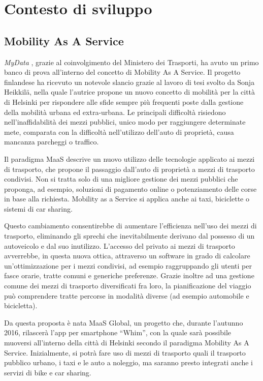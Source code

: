 \chapter{Contesto di sviluppo}
\label{capitolo2}
\thispagestyle{empty}

\section{Mobility As A Service}
\textit{MyData} \cite{mydatawebsite}, grazie al coinvolgimento del Ministero dei Trasporti, ha avuto un primo banco di prova all’interno del concetto di Mobility As A Service. Il progetto finlandese ha ricevuto un notevole slancio grazie al lavoro di tesi svolto da Sonja Heikkil\"a\cite{mastersonjaheikkil}, nella quale l’autrice propone un nuovo concetto di mobilit\`a per la citt\`a di Helsinki per rispondere alle sfide sempre pi\`u frequenti poste dalla gestione della mobilit\`a urbana ed extra-urbana. Le principali difficolt\`a risiedono nell’inaffidabilit\`a dei mezzi pubblici, unico modo per raggiungere determinate mete, comparata con la difficolt\`a nell'utilizzo dell’auto di propriet\`a, causa mancanza parcheggi o traffico.

Il paradigma MaaS descrive un nuovo utilizzo delle tecnologie applicato ai mezzi di trasporto, che propone il passaggio dall’auto di propriet\`a a mezzi di trasporto condivisi. Non si tratta solo di una migliore gestione dei mezzi pubblici che proponga, ad esempio, soluzioni di pagamento online o potenziamento delle corse in base alla richiesta. Mobility as a Service si applica anche ai taxi, biciclette o sistemi di car sharing. 

Questo cambiamento consentirebbe di aumentare l’efficienza nell’uso dei mezzi di trasporto, eliminando gli sprechi che inevitabilmente derivano dal possesso di un autoveicolo e dal suo inutilizzo. L’accesso del privato ai mezzi di trasporto avverrebbe, in questa nuova ottica, attraverso un software in grado di calcolare un'ottimizzazione per i mezzi condivisi, ad esempio raggruppando gli utenti per fasce orarie, tratte comuni e generiche preferenze. Grazie inoltre ad una gestione comune dei mezzi di trasporto diversificati fra loro, la pianificazione del viaggio pu\`o comprendere tratte percorse in modalit\`a diverse (ad esempio automobile e bicicletta).

Da questa proposta \`e nata MaaS Global\cite{maasglobal}, un progetto che, durante l’autunno 2016, rilascer\`a l’app per smartphone “Whim”, con la quale sar\`a possibile muoversi all’interno della citt\`a di Helsinki secondo il paradigma Mobility As A Service. Inizialmente, si potr\`a fare uso di mezzi di trasporto quali il trasporto pubblico urbano, i taxi e le auto a noleggio, ma saranno presto integrati anche i servizi di bike e car sharing.


